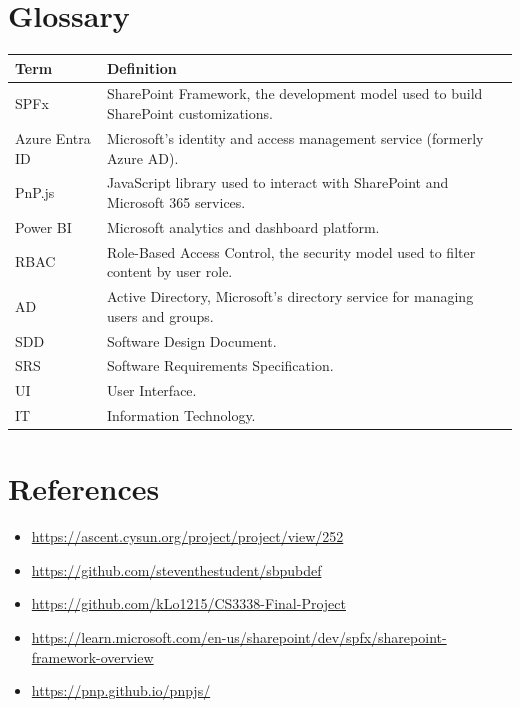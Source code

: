 \documentclass[12pt]{article}
\begin{document}
\section{Glossary}
\begin{longtable}{|p{1.4in}|p{4.6in}|}
\hline
\textbf{Term} & \textbf{Definition} \\ \hline
SPFx & SharePoint Framework, the development model used to build SharePoint customizations. \\ \hline
Azure Entra ID & Microsoft's identity and access management service (formerly Azure AD). \\ \hline
PnP.js & JavaScript library used to interact with SharePoint and Microsoft 365 services. \\ \hline
Power BI & Microsoft analytics and dashboard platform. \\ \hline
RBAC & Role-Based Access Control, the security model used to filter content by user role. \\ \hline
AD & Active Directory, Microsoft's directory service for managing users and groups. \\ \hline
SDD & Software Design Document. \\ \hline
SRS & Software Requirements Specification. \\ \hline
UI & User Interface. \\ \hline
IT & Information Technology. \\ \hline
\end{longtable}

\section{References}
\begin{itemize}
  \item \url{https://ascent.cysun.org/project/project/view/252}
  \item \url{https://github.com/steventhestudent/sbpubdef}
  \item \url{https://github.com/kLo1215/CS3338-Final-Project}
  \item \url{https://learn.microsoft.com/en-us/sharepoint/dev/spfx/sharepoint-framework-overview}
  \item \url{https://pnp.github.io/pnpjs/}
\end{itemize}
\end{document}
